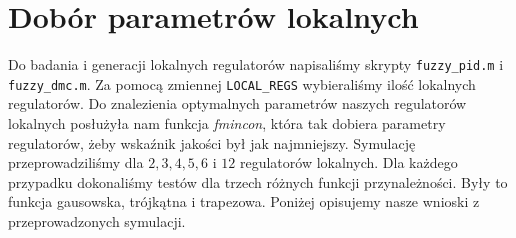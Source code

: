\section{Dobór parametrów lokalnych}
Do badania i generacji lokalnych regulatorów napisaliśmy skrypty \verb|fuzzy_pid.m| i \verb|fuzzy_dmc.m|. Za pomocą zmiennej \verb|LOCAL_REGS| wybieraliśmy ilość lokalnych regulatorów. Do znalezienia optymalnych parametrów naszych regulatorów lokalnych posłużyła nam funkcja \textit{fmincon}, która tak dobiera parametry regulatorów, żeby wskaźnik jakości był jak najmniejszy. Symulację przeprowadziliśmy dla $2, 3, 4, 5, 6$ i $12$ regulatorów lokalnych. Dla każdego przypadku dokonaliśmy testów dla trzech różnych funkcji przynależności. Były to funkcja  gausowska, trójkątna i trapezowa. Poniżej opisujemy nasze wnioski z przeprowadzonych symulacji. 
